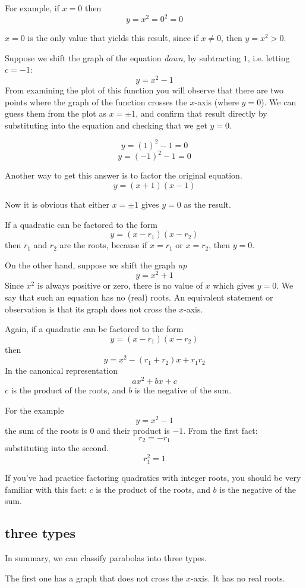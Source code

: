 \documentclass[11pt, oneside]{article}
\begin{document}
For example, if $x = 0$ then
\[ y = x^2 = 0^2 = 0 \]

$x = 0$ is the only value that yields this result, since if $x \ne 0$, then $y = x^2 > 0$.

Suppose we shift the graph of the equation \emph{down}, by subtracting $1$, i.e. letting $c = -1$:
\[ y = x^2 - 1 \]
From examining the plot of this function you will observe that there are two points where the graph of the function crosses the $x$-axis (where $y = 0$).  We can guess them from the plot as $x = \pm 1$, and confirm that result directly by substituting into the equation and checking that we get $y = 0$.

\[ y =  (1)^2 - 1 = 0 \]
\[ y =  (-1)^2 - 1 = 0 \]

Another way to get this answer is to factor the original equation.
\[ y = (x + 1)(x - 1) \]

Now it is obvious that either $x = \pm 1$ gives $y = 0$ as the result.

If a quadratic can be factored to the form
\[ y = (x - r_1)(x - r_2) \]
then $r_1$ and $r_2$ are the roots, because if $x = r_1$ or $x = r_2$, then $y = 0$.

On the other hand, suppose we shift the graph \emph{up}
\[ y = x^2 + 1 \]
Since $x^2$ is always positive or zero, there is no value of $x$ which gives $y = 0$.  We say that such an equation has no (real) roots.  An equivalent statement or observation is that its graph does not cross the $x$-axis.

Again, if a quadratic can be factored to the form
\[ y = (x - r_1)(x - r_2) \]
then
\[ y = x^2 - (r_1 + r_2) x + r_1 r_2 \]
In the canonical representation
\[ ax^2 + bx + c \]
$c$ is the product of the roots, and $b$ is the negative of the sum.

For the example 
\[ y = x^2 - 1 \]
the sum of the roots is $0$ and their product is $-1$.  From the first fact:
\[ r_2 = - r_1 \]
substituting into the second.
\[ r_1^2 = 1 \]

If you've had practice factoring quadratics with integer roots, you should be very familiar with this fact:  $c$ is the product of the roots, and $b$ is the negative of the sum.

\subsection*{three types}
In summary, we can classify parabolas into three types.  

The first one has a graph that does not cross the $x$-axis.  It has no real roots.
\end{document}
